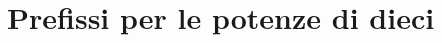 \documentclass[10pt,a4paper]{book}
\begin{document}







































\section*{Prefissi per le potenze di dieci}
\end{document}
